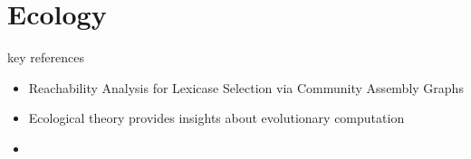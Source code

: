 \section{Ecology}
\label{sec:ecology}

key references
\begin{itemize}
  \item Reachability Analysis for Lexicase Selection via Community Assembly Graphs \citep{dolson2024reachability}
  \item Ecological theory provides insights about evolutionary computation \citep{dolson2018ecological}
  \item
\end{itemize}
